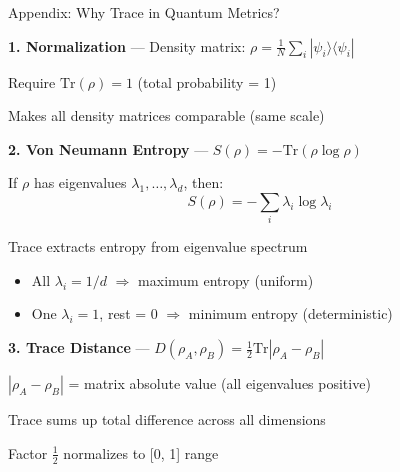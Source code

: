 \documentclass[aspectratio=169,11pt]{beamer}
\begin{document}
\begin{frame}{Appendix: Why Trace in Quantum Metrics?}

\textbf{1. Normalization} — Density matrix: $\rho = \frac{1}{N}\sum_i |\psi_i\rangle\langle\psi_i|$

Require $\text{Tr}(\rho) = 1$ (total probability = 1)

Makes all density matrices comparable (same scale)

\vspace{0.3em}

\textbf{2. Von Neumann Entropy} — $S(\rho) = -\text{Tr}(\rho \log \rho)$

If $\rho$ has eigenvalues $\lambda_1, \ldots, \lambda_d$, then:
$$S(\rho) = -\sum_{i} \lambda_i \log \lambda_i$$

Trace extracts entropy from eigenvalue spectrum

\begin{itemize}
  \item All $\lambda_i = 1/d$ $\Rightarrow$ maximum entropy (uniform)
  \item One $\lambda_i = 1$, rest = 0 $\Rightarrow$ minimum entropy (deterministic)
\end{itemize}

\vspace{0.3em}

\textbf{3. Trace Distance} — $D(\rho_A, \rho_B) = \frac{1}{2}\text{Tr}|\rho_A - \rho_B|$

$|\rho_A - \rho_B|$ = matrix absolute value (all eigenvalues positive)

Trace sums up total difference across all dimensions

Factor $\frac{1}{2}$ normalizes to [0, 1] range

\end{frame}
\end{document}
